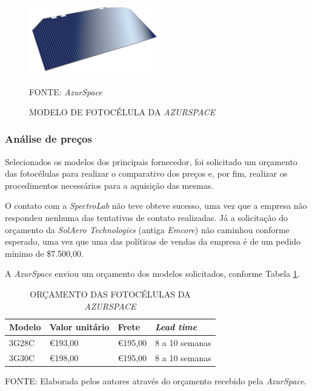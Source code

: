 \documentclass[
	12pt,				%
	openright,			%
	oneside,			%
	a4paper,			%
	english,			%
	french,				%
	spanish,			%
	brazil,				%
	oldfontcommands
	]{abntex2}
\begin{document}
	\begin{figure}[th]
		\caption{MODELO DE FOTOCÉLULA DA \textit{AZURSPACE}}
		\label{Fig_Cell_Azur}
		\centering
		\includegraphics[width=0.5\linewidth]{./figs/ZTJ}
			
		\begin{small}
			FONTE: \textit{AzurSpace}\textsuperscript{\cite{AzurSpace2}}
		\end{small}		
	\end{figure}	
	
\subsubsection[Análise de preços]{Análise de preços}

	Selecionados os modelos dos principais fornecedor, foi solicitado um orçamento das fotocélulas para realizar o comparativo dos preços e, por fim, realizar os procedimentos necessários para a aquisição das mesmas.
	
	O contato com a \textit{SpectroLab} não teve obteve sucesso, uma vez que a empresa não respondeu nenhuma das tentativas de contato realizadas. Já a solicitação do orçamento da \textit{SolAero Technologies} (antiga \textit{Emcore}) não caminhou conforme esperado, uma vez que uma das políticas de vendas da empresa é de um pedido mínimo de \$7.500,00.
	
	A \textit{AzurSpace} enviou um orçamento dos modelos solicitados, conforme Tabela \ref{Tab_Orc_Cell}.
	
	\begin{table}[th]
	\caption{ORÇAMENTO DAS FOTOCÉLULAS DA \textit{AZURSPACE}}
	\label{Tab_Orc_Cell}
	\centering
	\begin{tabular}{p{3.0cm}|p{3.0cm}|p{3.0cm}|p{3.0cm}}
		\textbf{Modelo} & \textbf{Valor unitário} & \textbf{Frete} & \textit{\textbf{Lead time}}\\
		\hline
		3G28C & \euro 193,00 & \euro 195,00 & 8 a 10 semanas\\
		3G30C & \euro 198,00 & \euro 195,00 & 8 a 10 semanas\\

	\end{tabular}
	
	\begin{small}
	\vspace{3pt}
		FONTE: Elaborada pelos autores através do orçamento recebido pela \textit{AzurSpace}.
	\end{small}
	\end{table}	
	
\end{document}

